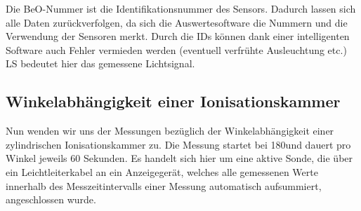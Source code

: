 Die BeO-Nummer ist die Identifikationsnummer des Sensors. Dadurch lassen sich alle Daten zurückverfolgen, da sich die Auswertesoftware die Nummern und die Verwendung der Sensoren merkt. Durch die IDs können dank einer intelligenten Software auch Fehler vermieden werden (eventuell verfrühte Ausleuchtung etc.) LS bedeutet hier das gemessene Lichtsignal.
		
\subsection{Winkelabhängigkeit einer Ionisationskammer} \label{sec:Ionkammer}

Nun wenden wir uns der Messungen bezüglich der Winkelabhängigkeit einer zylindrischen Ionisationskammer zu. Die Messung startet bei 180\textdegree und dauert pro Winkel jeweils 60 Sekunden.
Es handelt sich hier um eine aktive Sonde, die über ein Leichtleiterkabel an ein Anzeigegerät, welches alle gemessenen Werte innerhalb des Messzeitintervalls einer Messung automatisch aufsummiert, angeschlossen wurde.

